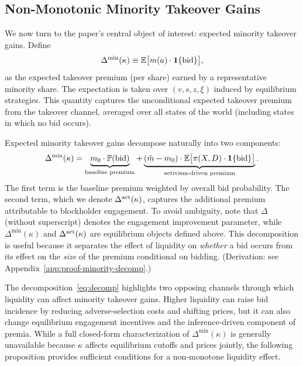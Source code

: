 \documentclass[11pt]{article}
\newcommand{\E}{\mathbb{E}}
\newcommand{\PP}{\mathbb{P}}
\newcommand{\1}{\mathbf{1}}
\begin{document}
\subsection{Non-Monotonic Minority Takeover Gains}

We now turn to the paper's central object of interest: expected minority takeover gains. Define
\begin{equation}
\Delta^{\min}(\kappa) \equiv \E\big[m(a) \cdot \1\{\textup{bid}\}\big],
\label{eq:minority}
\end{equation}
as the expected takeover premium (per share) earned by a representative minority share. The expectation is taken over $(v,s,z,\xi)$ induced by equilibrium strategies. This quantity captures the unconditional expected takeover premium from the takeover channel, averaged over all states of the world (including states in which no bid occurs).

Expected minority takeover gains decompose naturally into two components:
\begin{equation}
\Delta^{\min}(\kappa) = \underbrace{m_0 \cdot \PP(\textup{bid})}_{\text{baseline premium}} + \underbrace{(\tilde{m}-m_0)\cdot \E\big[\pi(X,D)\cdot \1\{\textup{bid}\}\big]}_{\text{activism-driven premium}}.
\label{eq:decomp}
\end{equation}
The first term is the baseline premium weighted by overall bid probability. The second term, which we denote $\Delta^{\textup{act}}(\kappa)$, captures the additional premium attributable to blockholder engagement. To avoid ambiguity, note that $\Delta$ (without superscript) denotes the engagement improvement parameter, while $\Delta^{\min}(\kappa)$ and $\Delta^{\textup{act}}(\kappa)$ are equilibrium objects defined above. This decomposition is useful because it separates the effect of liquidity on \emph{whether} a bid occurs from its effect on the \emph{size} of the premium conditional on bidding. (Derivation: see Appendix~\ref{app:proof-minority-decomp}.)

The decomposition~\eqref{eq:decomp} highlights two opposing channels through which liquidity can affect minority takeover gains. Higher liquidity can raise bid incidence by reducing adverse-selection costs and shifting prices, but it can also change equilibrium engagement incentives and the inference-driven component of premia. While a full closed-form characterization of $\Delta^{\min}(\kappa)$ is generally unavailable because $\kappa$ affects equilibrium cutoffs and prices jointly, the following proposition provides sufficient conditions for a non-monotone liquidity effect.
\end{document}
